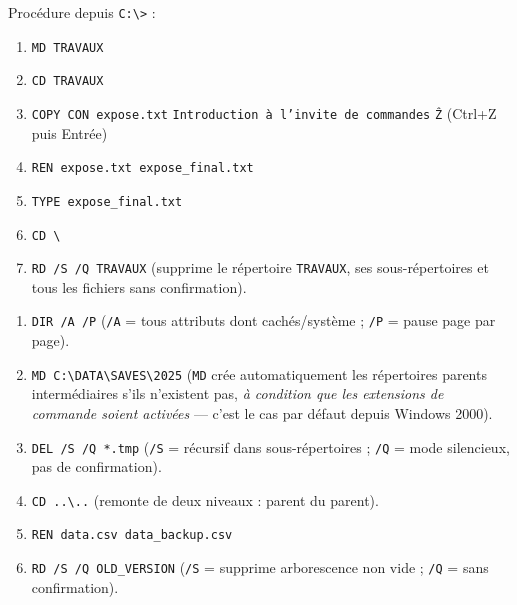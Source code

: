 \documentclass[11pt]{article}
\begin{document}
\begin{corrige}
Procédure depuis \texttt{C:\textbackslash>} :
\begin{enumerate}
    \item \texttt{MD TRAVAUX}
    \item \texttt{CD TRAVAUX}
    \item \texttt{COPY CON expose.txt} \newline
          \texttt{Introduction à l'invite de commandes} \newline
          \texttt{\^Z} (Ctrl+Z puis Entrée)
    \item \texttt{REN expose.txt expose\_final.txt}
    \item \texttt{TYPE expose\_final.txt}
    \item \texttt{CD \textbackslash}
    \item \texttt{RD /S /Q TRAVAUX} (supprime le répertoire \texttt{TRAVAUX}, ses sous-répertoires et tous les fichiers sans confirmation).
\end{enumerate}
\end{corrige}

\begin{corrige}
\begin{enumerate}
    \item \texttt{DIR /A /P} \quad (\texttt{/A} = tous attributs dont cachés/système ; \texttt{/P} = pause page par page).
    \item \texttt{MD C:\textbackslash DATA\textbackslash SAVES\textbackslash 2025} \quad (\texttt{MD} crée automatiquement les répertoires parents intermédiaires s'ils n'existent pas, \emph{à condition que les extensions de commande soient activées} — c'est le cas par défaut depuis Windows 2000).
    \item \texttt{DEL /S /Q *.tmp} \quad (\texttt{/S} = récursif dans sous-répertoires ; \texttt{/Q} = mode silencieux, pas de confirmation).
    \item \texttt{CD ..\textbackslash ..} \quad (remonte de deux niveaux : parent du parent).
    \item \texttt{REN data.csv data\_backup.csv}
    \item \texttt{RD /S /Q OLD\_VERSION} \quad (\texttt{/S} = supprime arborescence non vide ; \texttt{/Q} = sans confirmation).
\end{enumerate}
\end{corrige}
\end{document}
